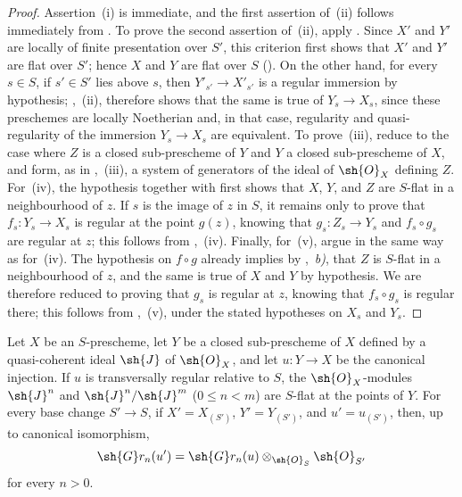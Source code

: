 \begin{proof}
Assertion~(i) is immediate, and the first assertion of~(ii) follows immediately from .
To prove the second assertion of~(ii), apply . Since $X'$ and $Y'$ are locally of finite presentation over $S'$, this criterion first shows that $X'$ and $Y'$ are flat over $S'$; hence $X$ and $Y$ are flat over $S$ (). On the other hand, for every $s\in S$, if $s'\in S'$ lies above $s$, then $Y'_{s'}\to X'_{s'}$ is a regular immersion by hypothesis; ,~(ii), therefore shows that the same is true of $Y_s\to X_s$, since these preschemes are locally Noetherian and, in that case, regularity and quasi-regularity of the immersion $Y_s\to X_s$ are equivalent.
To prove~(iii), reduce to the case where $Z$ is a closed sub-prescheme of $Y$ and $Y$ a closed sub-prescheme of $X$, and form, as in ,~(iii), a system of generators of the ideal of $\sh{O}_X$ defining $Z$.
For~(iv), the hypothesis together with  first shows that $X$, $Y$, and $Z$ are $S$-flat in a neighbourhood of $z$. If $s$ is the image of $z$ in $S$, it remains only to prove that $f_s:Y_s\to X_s$ is regular at the point $g(z)$, knowing that $g_s:Z_s\to Y_s$ and $f_s\circ g_s$ are regular at $z$; this follows from ,~(iv).
Finally, for~(v), argue in the same way as for~(iv). The hypothesis on $f\circ g$ already implies by ,~\emph{b)}, that $Z$ is $S$-flat in a neighbourhood of $z$, and the same is true of $X$ and $Y$ by hypothesis. We are therefore reduced to proving that $g_s$ is regular at $z$, knowing that $f_s\circ g_s$ is regular there; this follows from ,~(v), under the stated hypotheses on $X_s$ and $Y_s$.
\end{proof}


\begin{proposition}[19.2.8]
\label{IV.19.2.8}
Let $X$ be an $S$-prescheme, let $Y$ be a closed sub-prescheme of $X$ defined by a quasi-coherent ideal $\sh{J}$ of $\sh{O}_X$, and let $u:Y\to X$ be the canonical injection.
If $u$ is transversally regular relative to $S$, the $\sh{O}_X$-modules $\sh{J}^n$ and $\sh{J}^n/\sh{J}^m$ ($0\leq n<m$) are $S$-flat at the points of $Y$.
For every base change $S'\to S$, if $X'=X_{(S')}$, $Y'=Y_{(S')}$, and $u'=u_{(S')}$, then, up to canonical isomorphism,
\[
  \sh{G}r_n(u')=\sh{G}r_n(u)\otimes_{\sh{O}_S}\sh{O}_{S'}
\]
for every $n>0$.
\end{proposition}

